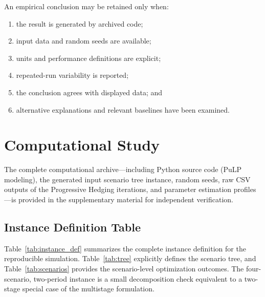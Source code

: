 \documentclass[11pt,a4paper]{article}
\begin{document}
An empirical conclusion may be retained only when:
\begin{enumerate}
  \item the result is generated by archived code;
  \item input data and random seeds are available;
  \item units and performance definitions are explicit;
  \item repeated-run variability is reported;
  \item the conclusion agrees with displayed data; and
  \item alternative explanations and relevant baselines have been
  examined.
\end{enumerate}

\section{Computational Study}

The complete computational archive---including Python source code (PuLP modeling), the generated input scenario tree instance, random seeds, raw CSV outputs of the Progressive Hedging iterations, and parameter estimation profiles---is provided in the supplementary material for independent verification.

\subsection{Instance Definition Table}
Table~\ref{tab:instance_def} summarizes the complete instance definition for the reproducible simulation. Table~\ref{tab:tree} explicitly defines the scenario tree, and Table~\ref{tab:scenarios} provides the scenario-level optimization outcomes. The four-scenario, two-period instance is a small decomposition check equivalent to a two-stage special case of the multistage formulation.
\end{document}
